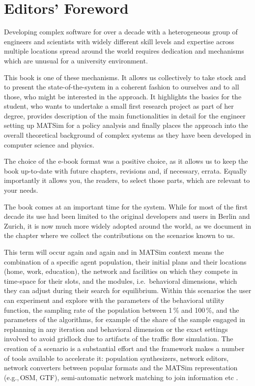 \chapter*{Editors' Foreword}
Developing complex software for over a decade with a heterogeneous group of engineers and scientists with widely different skill levels and expertise across multiple locations spread around the world requires dedication and mechanisms which are unusual for a university environment. 

This book is one of these mechanisms. It allows us collectively to take stock and to present the state-of-the-system in a coherent fashion to ourselves and to all those, who might be interested in the approach. It highlights the basics for the student, who wants to undertake a small  first research project as part of her degree, provides description of the main functionalities in detail for the engineer setting up MATSim for a policy analysis and finally places the approach into the overall theoretical background of complex systems as they have been developed in computer science and physics. 

The choice of the e-book format was a positive choice, as it allows us to keep the book up-to-date with future chapters, revisions and, if necessary, errata. Equally importantly it allows you, the readers, to select those parts, which are relevant to your needs. 

The book comes at an important time for the system. While for most of the first decade its use had been limited to the original developers and users in Berlin and Zurich, it is now much more widely adopted around the world, as we document in the chapter where we collect the contributions on the scenarios known to us. 

This term will occur again and again and in MATSim context means the combination of a specific agent population, their initial plans and their locations (home, work, education), the network and facilities on which they compete in time-space for their slots, and the modules, i.e.\, behavioral dimensions, which they can adjust during their search for equilibrium. Within this scenarios the user can experiment and explore with the parameters of the behavioral utility function, the sampling rate of the population between 1\,\% and 100\,\%, and the parameters of the algorithms, for example of the share of the sample engaged in replanning in any iteration and behavioral dimension or the exact settings involved to avoid gridlock due to artifacts of the traffic flow simulation. The creation of a \gls{scenario} is a substantial effort and the \gls{framework} makes a number of tools available to accelerate it: population synthesizers, network editors, network converters between popular formats and the MATSim representation (e.g.,\,OSM, GTF), semi-automatic network matching to join information etc .

